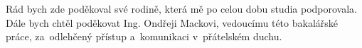 \documentclass[11pt,twoside,a4paper]{book}
\begin{document}
	
	\translate				%

	

	\coverpagestarts


	\acknowledgements
	\noindent
	Rád bych zde poděkoval své rodině, která mě po celou dobu studia podporovala. Dále bych chtěl poděkovat Ing. Ondřeji Mackovi, vedoucímu této bakalářské práce, za~odlehčený přístup a~komunikaci v~přátelském duchu.





 
	\abstractpage
\end{document}
